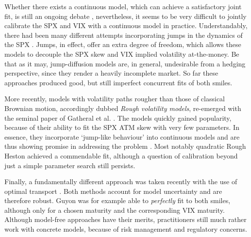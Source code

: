 Whether there exists a continuous model, which can achieve a satisfactory joint fit, is still an ongoing debate \cite{Acciaio2020ShortFutures, Guyon2019InversionMarket}, nevertheless, it seems to be very difficult to jointly calibrate the SPX and VIX with a continuous model in practice. Understandably, there had been many different attempts incorporating jumps in the dynamics of the SPX \cite{Cont2011ADERIVATIVES, Baldeaux2014ConsistentModel, Bardgett2013InferringMarkets, Papanicolaou2014AVolatilities, Kokholm2015JointModels, Pacati2018SmilingModel}. Jumps, in effect, offer an extra degree of freedom, which allows these models to decouple the SPX skew and VIX implied volatility at-the-money. Be that as it may, jump-diffusion models are, in general, undesirable from a hedging perspective, since they render a heavily incomplete market. So far these approaches produced good, but still imperfect concurrent fits of both smiles.

More recently, models with volatility paths rougher than those of classical Brownian motion, accordingly dubbed \textit{Rough volatility models}, re-emerged with the seminal paper of Gatheral et al. \cite{Gatheral2018VolatilityRough}. The models quickly gained popularity, because of their ability to fit the SPX ATM skew with very few parameters. In essence, they incorporate `jump-like behaviour' into continuous models and are thus showing promise in addressing the problem \cite{Jacquier2021RoughOptions, Horvath2020VolatilityModels, DeMarco2018VolatilityModels}. Most notably quadratic Rough Heston \cite{Gatheral2020TheProblem} achieved a commendable fit, although a question of calibration beyond just a simple parameter search still persists.

Finally, a fundamentally different approach was taken recently with the use of optimal transport \cite{Guyon2019TheSolved, Guo2020JointTransport}. Both methods account for model uncertainty and are therefore robust. Guyon \cite{Guyon2019TheSolved} was for example able to \textit{perfectly} fit to both smiles, although only for a chosen maturity and the corresponding VIX maturity. Although model-free approaches have their merits, practitioners still much rather work with concrete models, because of risk management and regulatory concerns. 



